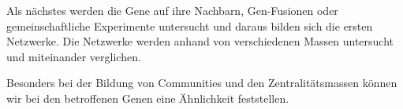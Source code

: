 \documentclass{article}
\begin{document}
Als nächstes werden die Gene auf ihre Nachbarn, Gen-Fusionen oder gemeinschaftliche Experimente untersucht und daraus bilden sich die ersten Netzwerke.
Die Netzwerke werden anhand von verschiedenen Massen untersucht und miteinander verglichen.

Besonders bei der Bildung von Communities und den Zentralitätsmassen können wir bei den betroffenen Genen eine Ähnlichkeit feststellen.



\newpage
\tableofcontents

\newpage

\pagestyle{fancy}
\fancyhf{}
\fancyfoot[L]{\thepage}
\fancyfoot[C]{\leftmark}
\fancyfoot[R]{\today}
\renewcommand{\headrulewidth}{2pt}
\renewcommand{\footrulewidth}{1pt}










\end{document}
